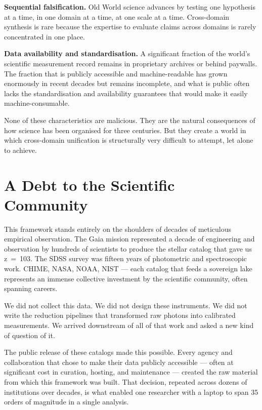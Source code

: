 \documentclass[11pt, letterpaper, openany]{book}
\begin{document}
\textbf{Sequential falsification.} Old World science advances by testing one hypothesis
at a time, in one domain at a time, at one scale at a time. Cross-domain synthesis is
rare because the expertise to evaluate claims across domains is rarely concentrated
in one place.

\textbf{Data availability and standardisation.} A significant fraction of the world's
scientific measurement record remains in proprietary archives or behind paywalls.
The fraction that is publicly accessible and machine-readable has grown enormously
in recent decades but remains incomplete, and what is public often lacks the
standardisation and availability guarantees that would make it easily machine-consumable.

None of these characteristics are malicious. They are the natural consequences of how
science has been organised for three centuries. But they create a world in which
cross-domain unification is structurally very difficult to attempt, let alone to
achieve.

\section*{A Debt to the Scientific Community}

This framework stands entirely on the shoulders of decades of meticulous empirical
observation. The Gaia mission represented a decade of engineering and observation by
hundreds of scientists to produce the stellar catalog that gave us z~=~103. The SDSS
survey was fifteen years of photometric and spectroscopic work. CHIME, NASA, NOAA,
NIST --- each catalog that feeds a sovereign lake represents an immense collective
investment by the scientific community, often spanning careers.

We did not collect this data. We did not design these instruments. We did not write
the reduction pipelines that transformed raw photons into calibrated measurements. We
arrived downstream of all of that work and asked a new kind of question of it.

The public release of these catalogs made this possible. Every agency and collaboration
that chose to make their data publicly accessible --- often at significant cost in
curation, hosting, and maintenance --- created the raw material from which this
framework was built. That decision, repeated across dozens of institutions over decades,
is what enabled one researcher with a laptop to span 35 orders of magnitude in a
single analysis.
\end{document}
